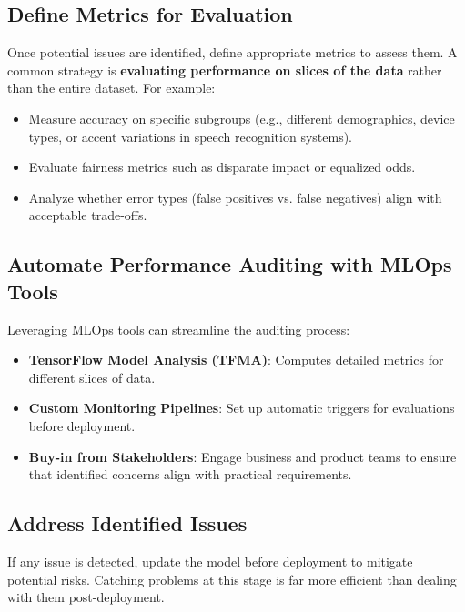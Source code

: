 \documentclass[12pt,openany]{book}
\begin{document}
\subsection{Define Metrics for Evaluation}
Once potential issues are identified, define appropriate metrics to assess them. A common strategy is \textbf{evaluating performance on slices of the data} rather than the entire dataset. For example:
\begin{itemize}
    \item Measure accuracy on specific subgroups (e.g., different demographics, device types, or accent variations in speech recognition systems).
    \item Evaluate fairness metrics such as disparate impact or equalized odds.
    \item Analyze whether error types (false positives vs. false negatives) align with acceptable trade-offs.
\end{itemize}

\subsection{Automate Performance Auditing with MLOps Tools}
Leveraging MLOps tools can streamline the auditing process:
\begin{itemize}
    \item \textbf{TensorFlow Model Analysis (TFMA)}: Computes detailed metrics for different slices of data.
    \item \textbf{Custom Monitoring Pipelines}: Set up automatic triggers for evaluations before deployment.
    \item \textbf{Buy-in from Stakeholders}: Engage business and product teams to ensure that identified concerns align with practical requirements.
\end{itemize}

\subsection{Address Identified Issues}
If any issue is detected, update the model before deployment to mitigate potential risks. Catching problems at this stage is far more efficient than dealing with them post-deployment.
\end{document}
